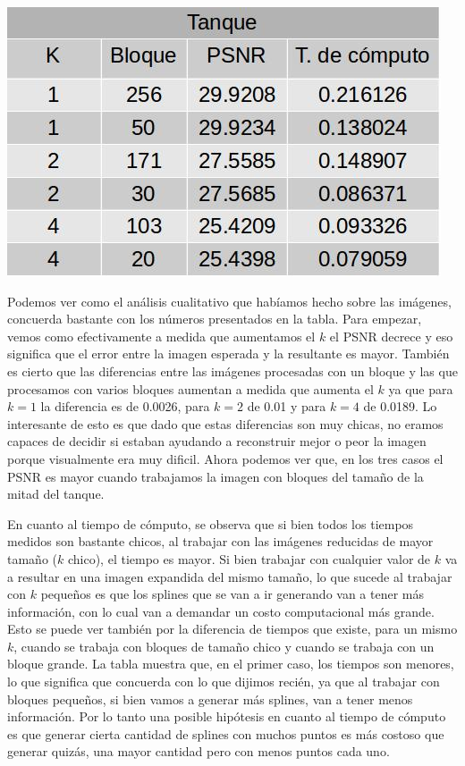 \documentclass[a4paper]{article}
\begin{document}
\centerline{
\includegraphics[scale=0.5]{imagenes/tanqueTabla.jpg}
}

Podemos ver como el análisis cualitativo que habíamos hecho sobre las imágenes, concuerda bastante con los números presentados en la tabla. Para empezar, vemos como efectivamente a medida que aumentamos el $k$ el PSNR decrece y eso significa que el error entre la imagen esperada y la resultante es mayor. También es cierto que las diferencias entre las imágenes procesadas con un bloque y las que procesamos con varios bloques aumentan a medida que aumenta el $k$ ya que para $k = 1$ la diferencia es de 0.0026, para $k = 2$ de 0.01 y para $k = 4$ de 0.0189. Lo interesante de esto es que dado que estas diferencias son muy chicas, no eramos capaces de decidir si estaban ayudando a reconstruir mejor o peor la imagen porque visualmente era muy dificil. Ahora podemos ver que, en los tres casos el PSNR es mayor cuando trabajamos la imagen con bloques del tamaño de la mitad del tanque.
\par En cuanto al tiempo de cómputo, se observa que si bien todos los tiempos medidos son bastante chicos, al trabajar con las imágenes reducidas de mayor tamaño ($k$ chico), el tiempo es mayor. Si bien trabajar con cualquier valor de $k$ va a resultar en una imagen expandida del mismo tamaño, lo que sucede al trabajar con $k$ pequeños es que los splines que se van a ir generando van a tener más información, con lo cual van a demandar un costo computacional más grande. Esto se puede ver también por la diferencia de tiempos que existe, para un mismo $k$, cuando se trabaja con bloques de tamaño chico y cuando se trabaja con un bloque grande. La tabla muestra que, en el primer caso, los tiempos son menores, lo que significa que concuerda con lo que dijimos recién, ya que al trabajar con bloques pequeños, si bien vamos a generar más splines, van a tener menos información. Por lo tanto una posible hipótesis en cuanto al tiempo de cómputo es que generar cierta cantidad de splines con muchos puntos es más costoso que generar quizás, una mayor cantidad pero con menos puntos cada uno.
\end{document}
